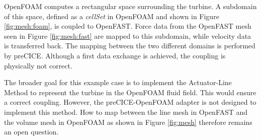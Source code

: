 OpenFOAM computes a rectangular space surrounding the turbine. A subdomain of this space, defined as a \textit{cellSet} in OpenFOAM and shown in Figure \ref{fig:mesh:foam}, is coupled to OpenFAST. Force data from the OpenFAST mesh seen in Figure \ref{fig:mesh:fast} are mapped to this subdomain, while velocity data is transferred back. The mapping between the two different domains is performed by preCICE. Although a first data exchange is achieved, the coupling is physically not correct.

The broader goal for this example case is to implement the Actuator-Line Method to represent the turbine in the OpenFOAM fluid field. This would ensure a correct coupling. However, the preCICE-OpenFOAM adapter is not designed to implement this method. How to map between the line mesh in OpenFAST and the volume mesh in OpenFOAM as shown in Figure \ref{fig:mesh} therefore remains an open question.

